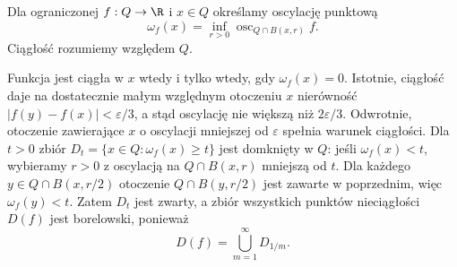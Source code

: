 \begin{definicja}
\label{ma2:def:point-oscillation-box}
Dla ograniczonej $f:Q\to\R$ i $x\in Q$ określamy
oscylację punktową
\[
 \omega_f(x)=\inf_{r>0}\operatorname{osc}_{Q\cap B(x,r)}f.
\]
Ciągłość rozumiemy względem $Q$.
\end{definicja}

Funkcja jest ciągła w $x$ wtedy i tylko wtedy,
gdy $\omega_f(x)=0$. Istotnie, ciągłość daje
na dostatecznie małym względnym otoczeniu $x$
nierówność $|f(y)-f(x)|<\varepsilon/3$,
a stąd oscylację nie większą niż $2\varepsilon/3$.
Odwrotnie, otoczenie zawierające $x$ o oscylacji
mniejszej od $\varepsilon$ spełnia warunek ciągłości.
Dla $t>0$ zbiór $D_t=\{x\in Q:\omega_f(x)\ge t\}$
jest domknięty w $Q$: jeśli $\omega_f(x)<t$,
wybieramy $r>0$ z oscylacją na $Q\cap B(x,r)$
mniejszą od $t$. Dla każdego $y\in Q\cap B(x,r/2)$
otoczenie $Q\cap B(y,r/2)$ jest zawarte w poprzednim,
więc $\omega_f(y)<t$. Zatem $D_t$ jest zwarty,
a zbiór wszystkich punktów nieciągłości $D(f)$
jest borelowski, ponieważ
\[
 D(f)=\bigcup_{m=1}^\infty D_{1/m}.
\]

